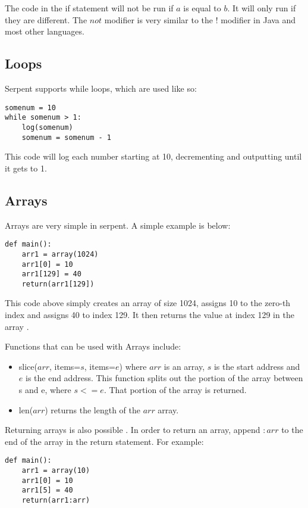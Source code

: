 \documentclass[12pt]{article}
\begin{document}
The code in the if statement will not be run if $a$ is equal to $b$. It will only run if they are different. The $not$ modifier is very similar to the $!$ modifier in Java and most other languages. \cite{Serpent}
	
\subsection{Loops}
Serpent supports while loops, which are used like so:
\begin{verbatim}
somenum = 10
while somenum > 1:
	log(somenum)
	somenum = somenum - 1
\end{verbatim}

This code will log each number starting at 10, decrementing and outputting until it gets to 1. \cite{Serpent1.0(old)}

\subsection{Arrays}
Arrays are very simple in serpent. A simple example is below:
\begin{verbatim}
def main():
	arr1 = array(1024)
	arr1[0] = 10
	arr1[129] = 40
	return(arr1[129])
\end{verbatim}

This code above simply creates an array of size 1024, assigns 10 to the zero-th index and assigns 40 to index 129. It then returns the value at index 129 in the array \cite{Serpent,Serpent1.0(old)}. 

Functions that can be used with Arrays include:
\begin{itemize}
	\item slice($arr$, items=$s$, items=$e$) where $arr$ is an array, $s$ is the start address and $e$ is the end address. This function splits out the portion of the array between s and e, where $s <= e$. That portion of the array is returned.
	\item len($arr$) returns the length of the $arr$ array.
\end{itemize}

Returning arrays is also possible \cite{Serpent}. In order to return an array, append $:arr$ to the end of the array in the return statement. For example:

\begin{verbatim}
def main():
	arr1 = array(10)
	arr1[0] = 10
	arr1[5] = 40
	return(arr1:arr)
\end{verbatim}
\end{document}
